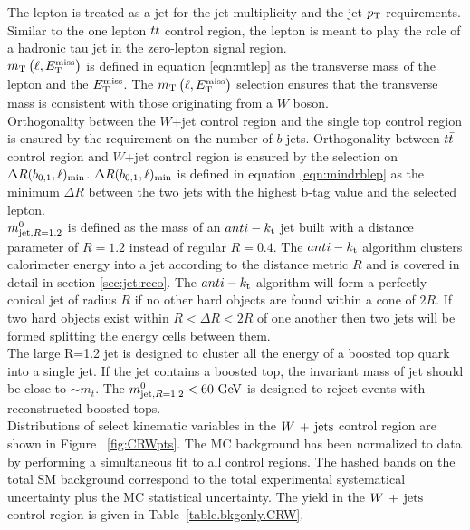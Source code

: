 \indent The lepton is treated as a jet for the jet multiplicity and the jet $p_{\mathrm{T}}$ requirements.  Similar to the one lepton $t\bar{t}$ control region, the lepton is meant to play the role of a hadronic tau jet in the zero-lepton signal region.  \\

\indent $m_{\mathrm{T}}\left(\ell,E_{\mathrm{T}}^{\mathrm{miss}}\right)$ is defined in equation \ref{eqn:mtlep} as the transverse mass of the lepton and the $E_{\mathrm{T}}^{\mathrm{miss}}$.  The $m_{\mathrm{T}}\left(\ell,E_{\mathrm{T}}^{\mathrm{miss}}\right)$ selection ensures that the transverse mass is consistent with those originating from a $W$ boson.  \\

\indent Orthogonality between the $W$+jet control region and the single top control region is ensured by the requirement on the number of $b$-jets.  Orthogonality between $t\bar{t}$ control region and $W$+jet control region is ensured by the selection on $\Delta R(b_{0,1},\ell)_{\mathrm{min}}$.  $\Delta R(b_{0,1},\ell)_{\mathrm{min}}$ is defined in equation \ref{eqn:mindrblep} as the minimum $\Delta R$ between the two jets with the highest b-tag value and the selected lepton. \\

\indent $m^{0}_{\mathrm{jet,}R=1.2}$ is defined as the mass of an $anti-k_{\rm{t}}$ jet built with a distance parameter of $R=1.2$ instead of regular $R=0.4$.  The $anti-k_{\rm{t}}$ algorithm clusters calorimeter energy into a jet according to the distance metric $R$ and is covered in detail in section \ref{sec:jet:reco}.  The $anti-k_{\rm{t}}$ algorithm will form a perfectly conical jet of radius $R$ if no other hard objects are found within a cone of $2R$.  If two hard objects exist within $R<\Delta R<2R$ of one another then two jets will be formed splitting the energy cells between them.  \\

\indent The large R=1.2 jet is designed to cluster all the energy of a boosted top quark into a single jet.  If the jet contains a boosted top, the invariant mass of jet should be close to $\sim m_t$. The $\mantikttwelvezero < 60 \gev$ is designed to reject events with reconstructed boosted tops.  \\

\indent  Distributions of select kinematic variables in the $W\,+\,\mathrm{jets}$ control region are shown in Figure ~\ref{fig:CRWpts}.  The MC background has been normalized to data by performing a simultaneous fit to all control regions.  The hashed bands on the total SM background correspond to the total experimental systematical uncertainty plus the MC statistical uncertainty.  The yield in the $W\,+\,\mathrm{jets}$ control region is given in Table~\ref{table.bkgonly.CRW}.  \\

